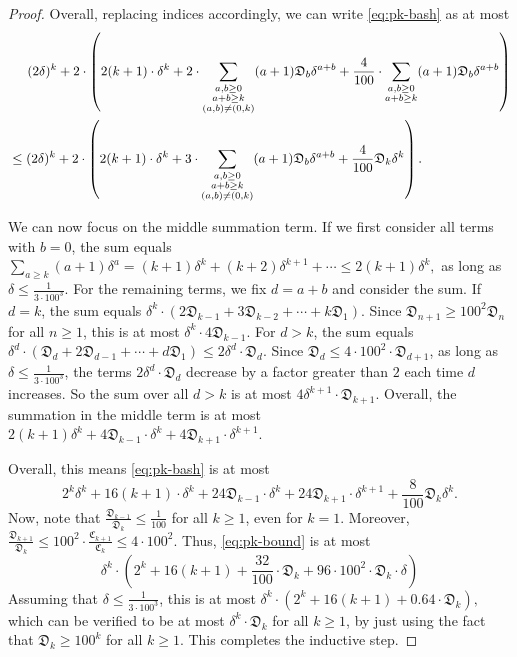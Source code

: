 \documentclass[12pt]{article}
\theoremstyle{definition}
\theoremstyle{remark}
\newcommand{\ten}{100}
\newcommand{\fC}{\mathfrak{C}}
\newcommand{\fD}{\mathfrak{D}}
\begin{document}
\begin{proof}
    Overall, replacing indices accordingly, we can write \eqref{eq:pk-bash} as at most
\begin{align*}
    &\hspace{0.5cm} (2\delta)^k + 2 \cdot \left(2(k+1) \cdot \delta^k + 2 \cdot \sum_{\substack{a, b \ge 0 \\ a+b \ge k \\ (a, b) \neq (0, k)}} (a+1) \fD_b \delta^{a+b} + \frac{4}{\ten} \cdot \sum_{\substack{a, b \ge 0 \\ a+b \ge k}} (a+1) \fD_b \delta^{a+b} \right) \\
    &\le (2\delta)^k + 2 \cdot \left(2(k+1) \cdot \delta^k + 3 \cdot \sum_{\substack{a, b \ge 0 \\ a+b \ge k \\ (a, b) \neq (0, k)}} (a+1) \fD_b \delta^{a+b} + \frac{4}{\ten} \fD_k \delta^k \right).
\end{align*}

    We can now focus on the middle summation term. If we first consider all terms with $b = 0$, the sum equals $\sum_{a \ge k} (a+1) \delta^a = (k+1) \delta^k + (k+2) \delta^{k+1} + \cdots \le 2 (k+1) \delta^k,$ as long as $\delta \le \frac{1}{3 \cdot \ten^3}$. For the remaining terms, we fix $d = a+b$ and consider the sum. If $d = k$, the sum equals $\delta^k \cdot (2 \fD_{k-1} + 3 \fD_{k-2} + \cdots + k \fD_1)$. Since $\fD_{n+1} \ge \ten^2 \fD_n$ for all $n \ge 1$, this is at most $\delta^k \cdot 4 \fD_{k-1}$. For $d > k$, the sum equals $\delta^d \cdot (\fD_{d} + 2 \fD_{d-1} + \cdots + d \fD_1) \le 2 \delta^d \cdot \fD_d$. Since $\fD_d \le 4 \cdot \ten^2 \cdot \fD_{d+1}$, as long as $\delta \le \frac{1}{3 \cdot \ten^3}$, the terms $2 \delta^{d} \cdot \fD_d$ decrease by a factor greater than $2$ each time $d$ increases. So the sum over all $d > k$ is at most $4 \delta^{k+1} \cdot \fD_{k+1}.$ Overall, the summation in the middle term is at most $2(k+1) \delta^k + 4 \fD_{k-1} \cdot \delta^k + 4 \fD_{k+1} \cdot \delta^{k+1}$.

    Overall, this means \eqref{eq:pk-bash} is at most
\begin{equation} \label{eq:pk-bound}
    2^k \delta^k + 16(k+1) \cdot \delta^k + 24 \fD_{k-1} \cdot \delta^k + 24 \fD_{k+1} \cdot \delta^{k+1} + \frac{8}{\ten} \fD_k \delta^k.
\end{equation}
    Now, note that $\frac{\fD_{k-1}}{\fD_k} \le \frac{1}{\ten}$ for all $k \ge 1$, even for $k = 1$. Moreover, $\frac{\fD_{k+1}}{\fD_k} \le \ten^2 \cdot \frac{\fC_{k+1}}{\fC_k} \le 4 \cdot \ten^2$. Thus, \eqref{eq:pk-bound} is at most
\[\delta^k \cdot \left(2^k + 16(k+1) + \frac{32}{100} \cdot \fD_k + 96 \cdot \ten^2 \cdot \fD_k \cdot \delta\right)\]
    Assuming that $\delta \le \frac{1}{3 \cdot \ten^3}$, this is at most $\delta^k \cdot \left(2^k + 16(k+1) + 0.64 \cdot \fD_k\right),$ which can be verified to be at most $\delta^k \cdot \fD_k$ for all $k \ge 1$, by just using the fact that $\fD_k \ge 100^k$ for all $k \ge 1$. This completes the inductive step.
\end{proof}
\end{document}
